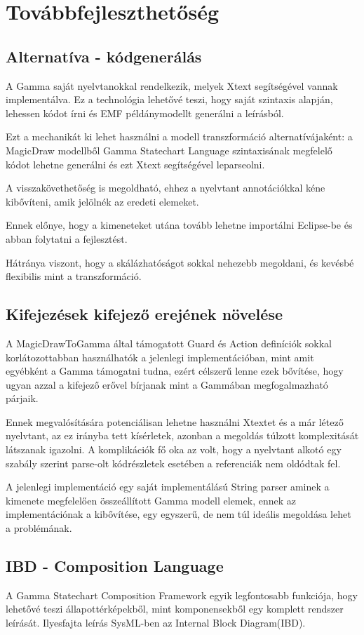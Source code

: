\chapter{Továbbfejleszthetőség}

\section{Alternatíva - kódgenerálás}
A Gamma saját nyelvtanokkal rendelkezik, melyek Xtext segítségével vannak implementálva. Ez a technológia lehetővé teszi, hogy saját szintaxis alapján, lehessen kódot írni és EMF példánymodellt generálni a leírásból.

Ezt a mechanikát ki lehet használni a modell transzformáció alternatívájaként: a MagicDraw modellből Gamma Statechart Language szintaxisának megfelelő kódot lehetne generálni és ezt Xtext segítségével leparseolni.

A visszakövethetőség is megoldható, ehhez a nyelvtant annotációkkal kéne kibővíteni, amik jelölnék az eredeti elemeket.

Ennek előnye, hogy a kimeneteket utána tovább lehetne importálni Eclipse-be és abban folytatni a fejlesztést.

Hátránya viszont, hogy a skálázhatóságot sokkal nehezebb megoldani, és kevésbé flexibilis mint a transzformáció.

\section{Kifejezések kifejező erejének növelése}
A MagicDrawToGamma által támogatott Guard és Action definíciók sokkal korlátozottabban használhatók a jelenlegi implementációban, mint amit egyébként a Gamma támogatni tudna, ezért célszerű lenne ezek bővítése, hogy ugyan azzal a kifejező erővel bírjanak mint a Gammában megfogalmazható párjaik.

Ennek megvalósítására potenciálisan lehetne használni Xtextet és a már létező nyelvtant, az ez irányba tett kísérletek, azonban a megoldás túlzott komplexitását látszanak igazolni. A komplikációk fő oka az volt, hogy a nyelvtant alkotó egy szabály szerint parse-olt kódrészletek esetében a referenciák nem oldódtak fel.

A jelenlegi implementáció egy saját implementálású String parser aminek a kimenete megfelelően összeállított Gamma modell elemek, ennek az implementációnak a kibővítése, egy egyszerű, de nem túl ideális megoldása lehet a problémának.

\section{IBD - Composition Language}
A Gamma Statechart Composition Framework egyik legfontosabb funkciója, hogy lehetővé teszi állapottérképekből, mint komponensekből egy komplett rendszer leírását. Ilyesfajta leírás SysML-ben az Internal Block Diagram(IBD).

